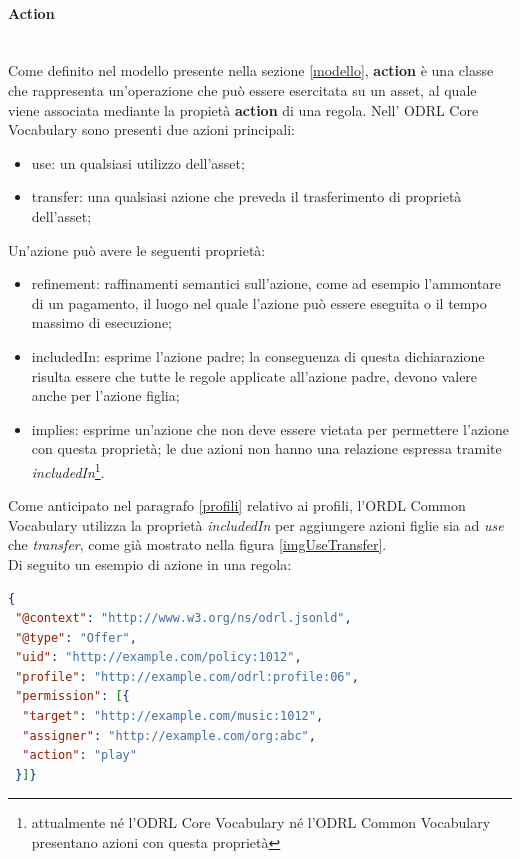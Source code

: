 \documentclass[12pt,a4paper,twoside]{book}
\begin{document}
\paragraph{Action}\mbox{}\\
Come definito nel modello presente nella sezione \ref{modello}, \textbf{action} è una classe che rappresenta un'operazione che può essere esercitata su un asset, al quale viene associata mediante la propietà \textbf{action} di una regola. Nell' ODRL Core Vocabulary sono presenti due azioni principali:
\begin{itemize}
	\item use: un qualsiasi utilizzo dell'asset;
	\item transfer: una qualsiasi azione che preveda il trasferimento di proprietà dell'asset;
\end{itemize}
Un'azione può avere le seguenti proprietà:
\begin{itemize}\label{includesProp}
	\item refinement: raffinamenti semantici sull'azione, come ad esempio l'ammontare di un pagamento, il luogo nel quale l'azione può essere eseguita o il tempo massimo di esecuzione;
	\item includedIn: esprime l'azione padre; la conseguenza di questa dichiarazione risulta essere che tutte le regole applicate all'azione padre, devono valere anche per l'azione figlia;
	\item implies: esprime un'azione che non deve essere vietata per permettere l'azione con questa proprietà; le due azioni non hanno una relazione espressa tramite \textit{includedIn}\footnote{attualmente né l'ODRL Core Vocabulary né l'ODRL Common Vocabulary presentano azioni con questa proprietà}. 
\end{itemize}
Come anticipato nel paragrafo \ref{profili} relativo ai profili, l'ORDL Common Vocabulary utilizza la proprietà \textit{includedIn} per aggiungere azioni figlie sia ad \textit{use} che \textit{transfer}, come già mostrato nella figura \ref{imgUseTransfer}.\\
Di seguito un esempio di azione in una regola:
\begin{lstlisting}[language=json,firstnumber=1,caption={L'azione \textbf{play} è presente nella proprietà \textbf{action} della regola},captionpos=b,label=esempioAction]
{
 "@context": "http://www.w3.org/ns/odrl.jsonld",
 "@type": "Offer",
 "uid": "http://example.com/policy:1012",
 "profile": "http://example.com/odrl:profile:06",
 "permission": [{
  "target": "http://example.com/music:1012",
  "assigner": "http://example.com/org:abc",
  "action": "play"
 }]}
\end{lstlisting}
\label{ConstraintODRL}
\end{document}
